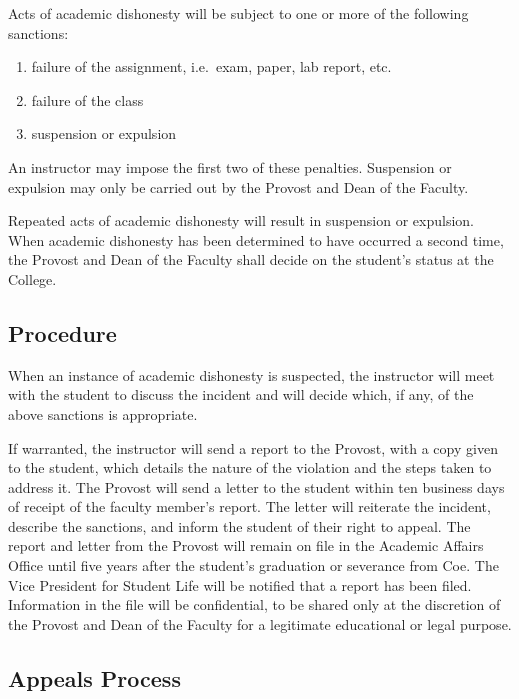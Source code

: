 \documentclass[
  letterpaper,
]{scrbook}
\providecommand{\tightlist}{%
  \setlength{\itemsep}{0pt}\setlength{\parskip}{0pt}}
\begin{document}
Acts of academic dishonesty will be subject to one or more of the
following sanctions:

\begin{enumerate}
\def\labelenumi{\arabic{enumi}.}
\tightlist
\item
  failure of the assignment, i.e.~exam, paper, lab report, etc.
\item
  failure of the class
\item
  suspension or expulsion
\end{enumerate}

An instructor may impose the first two of these penalties. Suspension or
expulsion may only be carried out by the Provost and Dean of the
Faculty.

Repeated acts of academic dishonesty will result in suspension or
expulsion. When academic dishonesty has been determined to have occurred
a second time, the Provost and Dean of the Faculty shall decide on the
student's status at the College.

\hypertarget{procedure}{%
\subsection{Procedure}\label{procedure}}

When an instance of academic dishonesty is suspected, the instructor
will meet with the student to discuss the incident and will decide
which, if any, of the above sanctions is appropriate.

If warranted, the instructor will send a report to the Provost, with a
copy given to the student, which details the nature of the violation and
the steps taken to address it. The Provost will send a letter to the
student within ten business days of receipt of the faculty member's
report. The letter will reiterate the incident, describe the sanctions,
and inform the student of their right to appeal. The report and letter
from the Provost will remain on file in the Academic Affairs Office
until five years after the student's graduation or severance from Coe.
The Vice President for Student Life will be notified that a report has
been filed. Information in the file will be confidential, to be shared
only at the discretion of the Provost and Dean of the Faculty for a
legitimate educational or legal purpose.

\hypertarget{appeals-process}{%
\subsection{Appeals Process}\label{appeals-process}}
\end{document}
